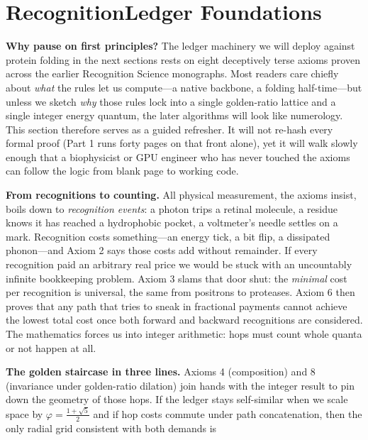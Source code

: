 \documentclass[11pt]{article}
\newcommand{\phiGR}{\varphi}                 %
\begin{document}
\section{Recognition\textendash Ledger Foundations}\label{sec:foundations}

\noindent
\textbf{Why pause on first principles?}  
The ledger machinery we will deploy against protein folding in the next
sections rests on eight deceptively terse axioms proven across the
earlier Recognition Science monographs.  Most readers care chiefly about
\emph{what} the rules let us compute—a native backbone, a folding
half-time—but unless we sketch \emph{why} those rules lock into a single
golden-ratio lattice and a single integer energy quantum, the later
algorithms will look like numerology.  This section therefore serves as
a guided refresher.  It will not re-hash every formal proof (Part 1 runs
forty pages on that front alone), yet it will walk slowly enough that a
biophysicist or GPU engineer who has never touched the axioms can follow
the logic from blank page to working code.

\bigskip
\noindent
\textbf{From recognitions to counting.}  
All physical measurement, the axioms insist, boils down to
\emph{recognition events}: a photon trips a retinal molecule, a residue
knows it has reached a hydrophobic pocket, a voltmeter’s needle settles
on a mark.  Recognition costs something—an energy tick, a bit flip, a
dissipated phonon—and Axiom 2 says those costs add without remainder.
If every recognition paid an arbitrary real price we would be stuck with
an uncountably infinite bookkeeping problem.  Axiom 3 slams that door
shut: the \emph{minimal} cost per recognition is universal, the same
from positrons to proteases.  Axiom 6 then proves that any path that
tries to sneak in fractional payments cannot achieve the lowest total
cost once both forward and backward recognitions are considered.  The
mathematics forces us into integer arithmetic: hops must count whole
quanta or not happen at all.

\bigskip
\noindent
\textbf{The golden staircase in three lines.}  
Axioms 4 (composition) and 8 (invariance under golden-ratio dilation)
join hands with the integer result to pin down the geometry of those
hops.  If the ledger stays self-similar when we scale space by
\(\phiGR=\tfrac{1+\sqrt5}{2}\) and if hop costs commute under path
concatenation, then the only radial grid consistent with both demands is  
\end{document}
